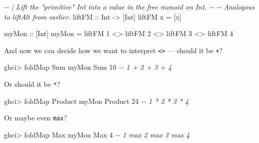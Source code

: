 \documentclass[]{article}
\newenvironment{Shaded}{}{}
\newcommand{\CommentTok}[1]{\textcolor[rgb]{0.38,0.63,0.69}{\textit{#1}}}
\newcommand{\DataTypeTok}[1]{\textcolor[rgb]{0.56,0.13,0.00}{#1}}
\newcommand{\DecValTok}[1]{\textcolor[rgb]{0.25,0.63,0.44}{#1}}
\newcommand{\FunctionTok}[1]{\textcolor[rgb]{0.02,0.16,0.49}{#1}}
\newcommand{\NormalTok}[1]{#1}
\newcommand{\OperatorTok}[1]{\textcolor[rgb]{0.40,0.40,0.40}{#1}}
\newcommand{\OtherTok}[1]{\textcolor[rgb]{0.00,0.44,0.13}{#1}}
\begin{document}
\begin{Shaded}
\begin{Highlighting}[]
\CommentTok{{-}{-} | Lift the "primitive" \textasciigrave{}Int\textasciigrave{} into a value in the free monoid on \textasciigrave{}Int\textasciigrave{}.}
\CommentTok{{-}{-}}
\CommentTok{{-}{-} Analogous to \textasciigrave{}liftAlt\textasciigrave{} from earlier.}
\OtherTok{liftFM ::} \DataTypeTok{Int} \OtherTok{{-}>}\NormalTok{ [}\DataTypeTok{Int}\NormalTok{]}
\NormalTok{liftFM x }\OtherTok{=}\NormalTok{ [x]}

\OtherTok{myMon ::}\NormalTok{ [}\DataTypeTok{Int}\NormalTok{]}
\NormalTok{myMon }\OtherTok{=}\NormalTok{ liftFM }\DecValTok{1} \OperatorTok{<>}\NormalTok{ liftFM }\DecValTok{2} \OperatorTok{<>}\NormalTok{ liftFM }\DecValTok{3} \OperatorTok{<>}\NormalTok{ liftFM }\DecValTok{4}
\end{Highlighting}
\end{Shaded}

And now we can decide how we want to interpret
\texttt{\textless{}\textgreater{}} --- should it be \texttt{+}?

\begin{Shaded}
\begin{Highlighting}[]
\NormalTok{ghci}\OperatorTok{>} \FunctionTok{foldMap} \DataTypeTok{Sum}\NormalTok{ myMon}
\DataTypeTok{Sum} \DecValTok{10}              \CommentTok{{-}{-} 1 + 2 + 3 + 4}
\end{Highlighting}
\end{Shaded}

Or should it be \texttt{*}?

\begin{Shaded}
\begin{Highlighting}[]
\NormalTok{ghci}\OperatorTok{>} \FunctionTok{foldMap} \DataTypeTok{Product}\NormalTok{ myMon}
\DataTypeTok{Product} \DecValTok{24}          \CommentTok{{-}{-} 1 * 2 * 3 * 4}
\end{Highlighting}
\end{Shaded}

Or maybe even \texttt{max}?

\begin{Shaded}
\begin{Highlighting}[]
\NormalTok{ghci}\OperatorTok{>} \FunctionTok{foldMap} \DataTypeTok{Max}\NormalTok{ myMon}
\DataTypeTok{Max} \DecValTok{4}          \CommentTok{{-}{-} 1 \textasciigrave{}max\textasciigrave{} 2 \textasciigrave{}max\textasciigrave{} 3 \textasciigrave{}max\textasciigrave{} 4}
\end{Highlighting}
\end{Shaded}
\end{document}
